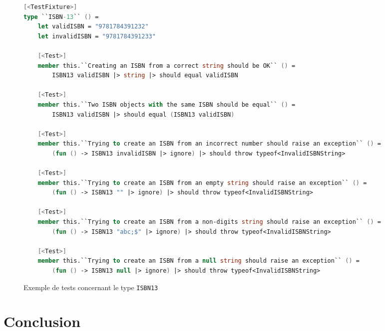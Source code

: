 \documentclass[journal, a4paper, frenchb]{IEEEtran}
\begin{document}
\begin{figure*}[!t]
\caption{Exemple de tests concernant le type \texttt{ISBN13}}
\label{fig_test_example_isbn13}
\begin{lstlisting}[language=FSharp, frame=single, basicstyle=\ttfamily\scriptsize]
[<TestFixture>]
type ``ISBN-13`` () =
    let validISBN = "9781784391232"
    let invalidISBN = "9781784391233"

    [<Test>]
    member this.``Creating an ISBN from a correct string should be OK`` () =
        ISBN13 validISBN |> string |> should equal validISBN

    [<Test>]
    member this.``Two ISBN objects with the same ISBN should be equal`` () = 
        ISBN13 validISBN |> should equal (ISBN13 validISBN)

    [<Test>]
    member this.``Trying to create an ISBN from an incorrect number should raise an exception`` () =
        (fun () -> ISBN13 invalidISBN |> ignore) |> should throw typeof<InvalidISBNString>

    [<Test>]
    member this.``Trying to create an ISBN from an empty string should raise an exception`` () =
        (fun () -> ISBN13 "" |> ignore) |> should throw typeof<InvalidISBNString>

    [<Test>]
    member this.``Trying to create an ISBN from a non-digits string should raise an exception`` () = 
        (fun () -> ISBN13 "abc;$" |> ignore) |> should throw typeof<InvalidISBNString>

    [<Test>]
    member this.``Trying to create an ISBN from a null string should raise an exception`` () =
        (fun () -> ISBN13 null |> ignore) |> should throw typeof<InvalidISBNString>
\end{lstlisting}
\end{figure*}




\section{Conclusion}

\ifCLASSOPTIONcaptionsoff
  \newpage
\fi


\end{document}
